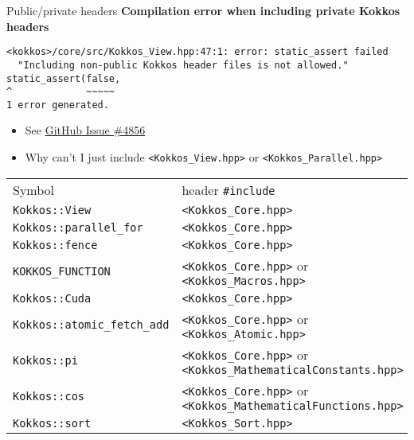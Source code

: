\begin{frame}[fragile]{Public/private headers}
\textbf{Compilation error when including private Kokkos headers}

{\tiny
\begin{verbatim}
<kokkos>/core/src/Kokkos_View.hpp:47:1: error: static_assert failed
  "Including non-public Kokkos header files is not allowed."
static_assert(false,
^             ~~~~~
1 error generated.
\end{verbatim}
}

\begin{itemize}
\item See \href{https://github.com/kokkos/kokkos/issues/4856}{GitHub Issue \#4856}
\item Why can't I just include \texttt{<Kokkos\_View.hpp>} or \texttt{<Kokkos\_Parallel.hpp>}
\end{itemize}


\tiny
\begin{tabular}{ll}
Symbol & header \texttt{\#include} \\
\texttt{Kokkos::View}          & \texttt{<Kokkos\_Core.hpp>} \\
\texttt{Kokkos::parallel\_for} & \texttt{<Kokkos\_Core.hpp>} \\
\texttt{Kokkos::fence}         & \texttt{<Kokkos\_Core.hpp>} \\
\texttt{KOKKOS\_FUNCTION}      & \texttt{<Kokkos\_Core.hpp>} or \texttt{<Kokkos\_Macros.hpp>} \\
\texttt{Kokkos::Cuda}          & \texttt{<Kokkos\_Core.hpp>} \\
\texttt{Kokkos::atomic\_fetch\_add} & \texttt{<Kokkos\_Core.hpp>} or \texttt{<Kokkos\_Atomic.hpp>} \\
\texttt{Kokkos::pi}            & \texttt{<Kokkos\_Core.hpp>} or \texttt{<Kokkos\_MathematicalConstants.hpp>} \\
\texttt{Kokkos::cos}           & \texttt{<Kokkos\_Core.hpp>} or \texttt{<Kokkos\_MathematicalFunctions.hpp>} \\
\texttt{Kokkos::sort}          & \texttt{<Kokkos\_Sort.hpp>} \\
\end{tabular}


\end{frame}


